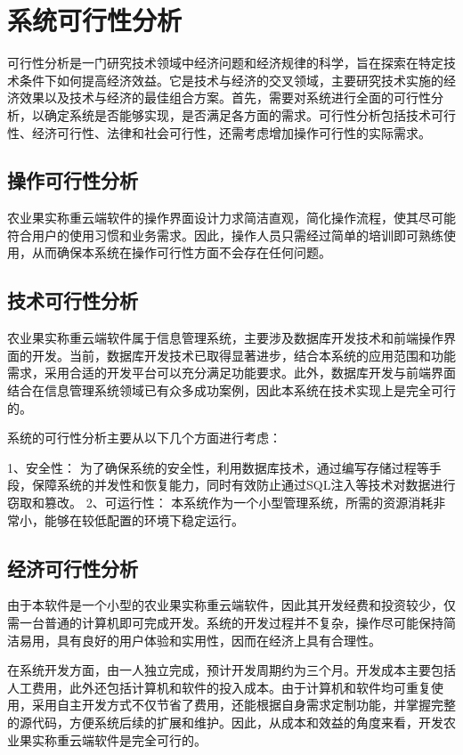 \section{系统可行性分析}

可行性分析是一门研究技术领域中经济问题和经济规律的科学，旨在探索在特定技术条件下如何提高经济效益。它是技术与经济的交叉领域，主要研究技术实施的经济效果以及技术与经济的最佳组合方案。首先，需要对系统进行全面的可行性分析，以确定系统是否能够实现，是否满足各方面的需求。可行性分析包括技术可行性、经济可行性、法律和社会可行性，还需考虑增加操作可行性的实际需求。

\subsection{操作可行性分析}

农业果实称重云端软件的操作界面设计力求简洁直观，简化操作流程，使其尽可能符合用户的使用习惯和业务需求。因此，操作人员只需经过简单的培训即可熟练使用，从而确保本系统在操作可行性方面不会存在任何问题。

\subsection{技术可行性分析}

农业果实称重云端软件属于信息管理系统，主要涉及数据库开发技术和前端操作界面的开发。当前，数据库开发技术已取得显著进步，结合本系统的应用范围和功能需求，采用合适的开发平台可以充分满足功能要求。此外，数据库开发与前端界面结合在信息管理系统领域已有众多成功案例，因此本系统在技术实现上是完全可行的。

系统的可行性分析主要从以下几个方面进行考虑：
	
1、安全性：
    为了确保系统的安全性，利用数据库技术，通过编写存储过程等手段，保障系统的并发性和恢复能力，同时有效防止通过SQL注入等技术对数据进行窃取和篡改。
2、可运行性：
    本系统作为一个小型管理系统，所需的资源消耗非常小，能够在较低配置的环境下稳定运行。

\subsection{经济可行性分析}

由于本软件是一个小型的农业果实称重云端软件，因此其开发经费和投资较少，仅需一台普通的计算机即可完成开发。系统的开发过程并不复杂，操作尽可能保持简洁易用，具有良好的用户体验和实用性，因而在经济上具有合理性。

在系统开发方面，由一人独立完成，预计开发周期约为三个月。开发成本主要包括人工费用，此外还包括计算机和软件的投入成本。由于计算机和软件均可重复使用，采用自主开发方式不仅节省了费用，还能根据自身需求定制功能，并掌握完整的源代码，方便系统后续的扩展和维护。因此，从成本和效益的角度来看，开发农业果实称重云端软件是完全可行的。

